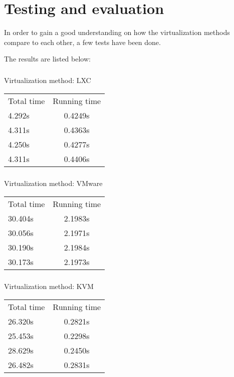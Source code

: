 \chapter{Testing and evaluation}
\label{chapter:virt-testing}

In order to gain a good understanding on how the virtualization methods
compare to each other, a few tests have been done.

The results are listed below:

\paragraph {}

Virtualization method: LXC

\begin{tabular}{ l | c }
Total time & Running time \\
4.292s & 0.4249s  \\
4.311s & 0.4363s  \\
4.250s & 0.4277s  \\
4.311s & 0.4406s  \\
\end{tabular}

\paragraph {}


Virtualization method: VMware

\begin{tabular}{ l | c }
Total time & Running time \\
30.404s & 2.1983s  \\
30.056s & 2.1971s  \\
30.190s & 2.1984s  \\
30.173s & 2.1973s  \\
\end{tabular}

\paragraph {}

Virtualization method: KVM

\begin{tabular}{ l | c }
Total time & Running time \\
26.320s & 0.2821s  \\
25.453s & 0.2298s  \\
28.629s & 0.2450s  \\
26.482s & 0.2831s  \\
\end{tabular}


